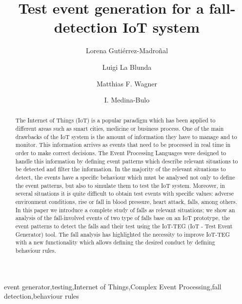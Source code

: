\documentclass[review]{elsarticle}
\begin{document}
\begin{frontmatter}

\title{Test event generation for a fall-detection IoT system}


\author{Lorena Guti\'errez-Madro\~nal}
\author{Luigi La Blunda}
\author{Matthias F. Wagner}
\author{I. Medina-Bulo}
\address[label1]{UCASE Software Engineering Research group, University of Cadiz, Av. Universidad de Cadiz, 10, 11519 Puerto Real, Spain.}
\address[label2]{WSN and IOT Research Group Frankfurt University of Applied Sciences.}


\begin{abstract}
The Internet of Things (IoT) is a popular paradigm which has been applied to different areas 
such as smart cities, medicine or business process. One of the main drawbacks of the IoT system is the 
amount of information they have to manage and to monitor. This information arrives as events that need 
to be processed in real time in order to make correct decisions. The Event Processing Languages were 
designed to handle this information by defining event patterns which describe relevant situations to be 
detected and filter the information. 
In the majority of the relevant situations to detect, the events have a specific behaviour which must be analysed
not only to define the event patterns, but also to simulate them to test the IoT system. Moreover, in several 
situations it is quite difficult to obtain test events with specific values: adverse environment conditions, 
rise or fall in blood pressure, heart attack, falls, among others. 
In this paper we introduce a complete study of falls as relevant situations; we show an analysis of the fall-involved
events of two type of falls base on an IoT prototype, the event patterns to detect the falls and their test using 
the IoT-TEG (IoT - Test Event Generator) tool. The fall analysis has highlighted the necessity to improve IoT-TEG 
with a new functionality which allows defining the desired conduct by defining behaviour rules.
\end{abstract}

\begin{keyword}
event generator\sep testing\sep Internet of Things\sep Complex Event Processing\sep fall detection\sep behaviour rules
\end{keyword}

\end{frontmatter}
\end{document}
